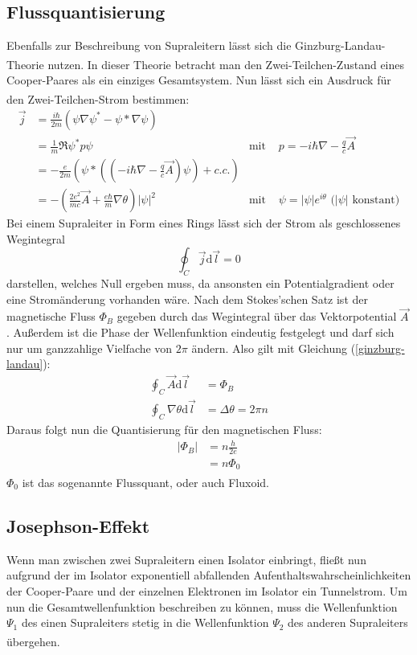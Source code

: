 \documentclass[12pt]{article}
\begin{document}
\subsection{Flussquantisierung}
Ebenfalls zur Beschreibung von Supraleitern lässt sich die Ginzburg-Landau-Theorie\textsuperscript{\cite{anleitung}} nutzen. In dieser Theorie betracht man den Zwei-Teilchen-Zustand eines Cooper-Paares als ein einziges Gesamtsystem. Nun lässt sich ein Ausdruck für den Zwei-Teilchen-Strom bestimmen\textsuperscript{\cite{anleitung}}:
\begin{align}
	\vec j&=\frac{i\hbar}{2m}\left(\psi\nabla\psi^* -\psi*\nabla\psi\right)\\
	&=\frac1m\Re{\psi^*p\psi}&\text{mit }&p=-i\hbar\nabla-\frac qc\vec A\\
	&=-\frac{e}{2m}\left(\psi*\left(\left(-i\hbar\nabla-\frac qc\vec A\right)\psi\right)+c.c.\right)\\
	&=-\left(\frac{2e^2}{mc}\vec A+\frac{e\hbar}{m}\nabla\theta\right)|\psi|^2&\text{mit }&\psi=|\psi|e^{i\theta}\text{ (}|\psi|\text{ konstant)}\label{ginzburg-landau}
\end{align}
Bei einem Supraleiter in Form eines Rings lässt sich der Strom als geschlossenes Wegintegral $$\oint_C\vec j\mathrm d\vec l=0$$ darstellen, welches Null ergeben muss, da ansonsten ein Potentialgradient oder eine Stromänderung vorhanden wäre. Nach dem Stokes'schen Satz ist der magnetische Fluss $\Phi_B$ gegeben durch das Wegintegral über das Vektorpotential $\vec{A}$. Außerdem ist die Phase der Wellenfunktion eindeutig festgelegt und darf sich nur um ganzzahlige Vielfache von $2\pi$ ändern. Also gilt mit Gleichung (\ref{ginzburg-landau}):
\begin{align*}
	\oint_C\vec A\mathrm d\vec l&=\Phi_B\\
	\oint_C\nabla\theta\mathrm d\vec l&=\Delta\theta=2\pi n
\end{align*}
Daraus folgt nun die Quantisierung für den magnetischen Fluss:
\begin{align*}
	|\Phi_B|&=n\frac h{2e}\\
	&=n\Phi_0
\end{align*}
$\Phi_0$ ist das sogenannte Flussquant, oder auch Fluxoid\textsuperscript{\cite{anleitung}}.
\subsection{Josephson-Effekt}
Wenn man zwischen zwei Supraleitern einen Isolator einbringt, fließt nun aufgrund der im Isolator exponentiell abfallenden Aufenthaltswahrscheinlichkeiten der Cooper-Paare und der einzelnen Elektronen im Isolator ein Tunnelstrom. Um nun die Gesamtwellenfunktion beschreiben zu können, muss die Wellenfunktion $\Psi_1$ des einen Supraleiters stetig in die Wellenfunktion $\Psi_2$ des anderen Supraleiters übergehen. \textsuperscript{\cite{SQUID}}
\end{document}
